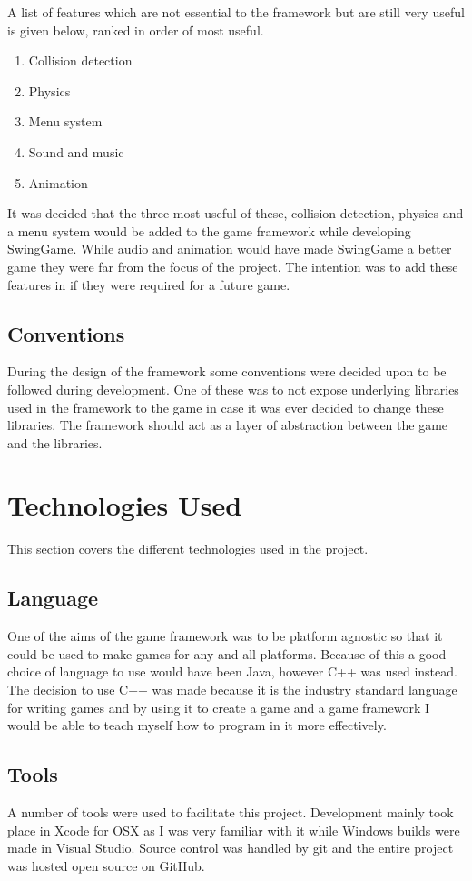 \documentclass[]{report}
\begin{document}
		A list of features which are not essential to the framework but are still very useful is given below, ranked in order of most useful.
		\begin{enumerate}
			\item{Collision detection}
			\item{Physics}
			\item{Menu system}
			\item{Sound and music}
			\item{Animation}
		\end{enumerate}
		It was decided that the three most useful of these, collision detection, physics and a menu system would be added to the game framework while developing SwingGame. While audio and animation would have made SwingGame a better game they were far from the focus of the project. The intention was to add these features in if they were required for a future game.
		
		\subsection{Conventions}
		During the design of the framework some conventions were decided upon to be followed during development. One of these was to not expose underlying libraries used in the framework to the game in case it was ever decided to change these libraries. The framework should act as a layer of abstraction between the game and the libraries.
		
	\section{Technologies Used}
		This section covers the different technologies used in the project.
		\subsection{Language}
		One of the aims of the game framework was to be platform agnostic so that it could be used to make games for any and all platforms. Because of this a good choice of language to use would have been Java, however C++ was used instead. The decision to use C++ was made because it is the industry standard language for writing games and by using it to create a game and a game framework I would be able to teach myself how to program in it more effectively.
		\subsection{Tools}
		A number of tools were used to facilitate this project. Development mainly took place in Xcode for OSX as I was very familiar with it while Windows builds were made in Visual Studio. Source control was handled by git and the entire project was hosted open source on GitHub.
\end{document}
